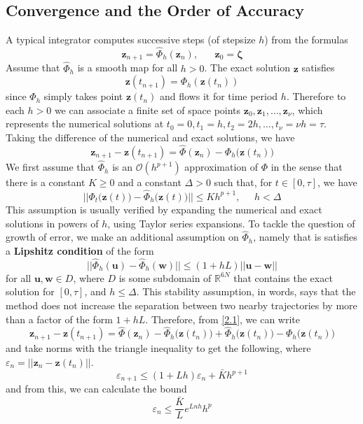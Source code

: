 \documentclass{article}
\theoremstyle{remark}
\theoremstyle{definition}
\begin{document}
\subsection{Convergence and the Order of Accuracy}
A typical integrator computes successive steps (of stepsize $h$) from the formulas 
\[\mathbf{z}_{n+1} = \hat{\Phi}_h (\mathbf{z}_n), \;\;\;\;\;\; \mathbf{z}_0 = \boldsymbol{\zeta}\]
Assume that $\hat{\Phi}_h$ is a smooth map for all $h > 0$. The exact solution $\mathbf{z}$ satisfies
\[\mathbf{z} (t_{n+1}) = \Phi_h (\mathbf{z}(t_n))\]
since $\Phi_h$ simply takes point $\mathbf{z}(t_n)$ and flows it for time period $h$. Therefore to each $h > 0$ we can associate a finite set of space points $\mathbf{z}_0, \mathbf{z}_1, \ldots, \mathbf{z}_\nu$, which represents the numerical solutions at $t_0 = 0, t_1 = h, t_2 = 2h, \ldots, t_\nu = \nu h = \tau$. Taking the difference of the numerical and exact solutions, we have 
\[\mathbf{z}_{n+1} - \mathbf{z}(t_{n+1}) = \hat{\Phi}(\mathbf{z}_n) - \Phi_h \big(\mathbf{z}(t_n) \big) \label{2.1} \tag{2.1} \]
We first assume that $\hat{\Phi}_h$ is an $\mathcal{O}(h^{p+1})$ approximation of $\Phi$ in the sense that there is a constant $K \geq 0$ and a constant $\Delta > 0$ such that, for $t \in [0, \tau]$, we have 
\[|| \Phi_t\big(\mathbf{z}(t)\big) - \hat{\Phi}_h \big(\mathbf{z}(t)\big) || \leq K h^{p+1}, \;\;\;\;\; h < \Delta\]
This assumption is usually verified by expanding the numerical and exact solutions in powers of $h$, using Taylor series expansions. To tackle the question of growth of error, we make an additional assumption on $\hat{\Phi}_h$, namely that is satisfies a \textbf{Lipshitz condition} of the form 
\[||\hat{\Phi}_h (\mathbf{u}) - \hat{\Phi}_h (\mathbf{w})|| \leq (1 + h L) || \mathbf{u} - \mathbf{w}||\]
for all $\mathbf{u}, \mathbf{w} \in D$, where $D$ is some subdomain of $\mathbb{R}^{6N}$ that contains the exact solution for $[0, \tau]$, and $h \leq \Delta$. This stability assumption, in words, says that the method does not increase the separation between two nearby trajectories by more than a factor of the form $1 + hL$. Therefore, from \eqref{2.1}, we can write 
\[\mathbf{z}_{n+1} - \mathbf{z}(t_{n+1}) = \hat{\Phi}(\mathbf{z}_n) - \hat{\Phi}_h \big(\mathbf{z}(t_n)\big) + \hat{\Phi}_h \big(\mathbf{z}(t_n)\big) - \Phi_h \big(\mathbf{z}(t_n) \big)\]
and take norms with the triangle inequality to get the following, where $\varepsilon_n = ||\mathbf{z}_n - \mathbf{z}(t_n)||$. 
\[\varepsilon_{n+1} \leq (1 + L h) \varepsilon_n + \bar{K} h^{p+1}\]
and from this, we can calculate the bound 
\[\varepsilon_n \leq \frac{\bar{K}}{L} e^{L n h} h^p\]
\end{document}
